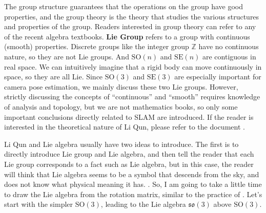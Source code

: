 The group structure guarantees that the operations on the group have good properties, and the group theory is the theory that studies the various structures and properties of the group. Readers interested in group theory can refer to any of the recent algebra textbooks. \textbf{Lie Group} refers to a group with continuous (smooth) properties. Discrete groups like the integer group $\mathbb{Z}$ have no continuous nature, so they are not Lie groups. And $\mathrm{SO}(n)$ and $\mathrm{SE}(n)$ are contiguous in real space. We can intuitively imagine that a rigid body can move continuously in space, so they are all Lie. Since $\mathrm{SO}(3)$ and $\mathrm{SE}(3)$ are especially important for camera pose estimation, we mainly discuss these two Lie groups. However, strictly discussing the concepts of “continuous” and “smooth” requires knowledge of analysis and topology, but we are not mathematics books, so only some important conclusions directly related to SLAM are introduced. If the reader is interested in the theoretical nature of Li Qun, please refer to the document \cite{Varadarajan2013}.

Li Qun and Lie algebra usually have two ideas to introduce. The first is to directly introduce Lie group and Lie algebra, and then tell the reader that each Lie group corresponds to a fact such as Lie algebra, but in this case, the reader will think that Lie algebra seems to be a symbol that descends from the sky, and does not know what physical meaning it has. . So, I am going to take a little time to draw the Lie algebra from the rotation matrix, similar to the practice of \cite{Ma2012}. Let's start with the simpler $\mathrm{SO}(3)$, leading to the Lie algebra $\mathfrak{so}(3)$ above $\mathrm{SO}(3)$.

